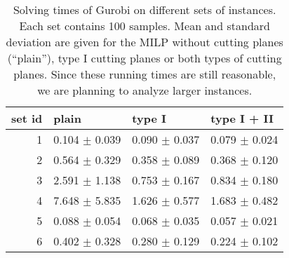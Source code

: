 

\begin{knitrout}
\color{fgcolor}\begin{table}

\caption{\label{tab:unnamed-chunk-2}Solving times of Gurobi on different sets of instances. Each set contains 100 samples. Mean and standard deviation are given for the MILP without cutting planes (``plain''), type I cutting planes or both types of cutting planes. {\color{blue} Since these running times are still reasonable, we are planning to analyze larger instances.} \label{tab:running_times}}
\centering
\begin{tabular}[t]{rlll}
\toprule
set id & plain & type I & type I + II\\
\midrule
1 & 0.104 $\pm$ 0.039 & 0.090 $\pm$ 0.037 & 0.079 $\pm$ 0.024\\
2 & 0.564 $\pm$ 0.329 & 0.358 $\pm$ 0.089 & 0.368 $\pm$ 0.120\\
3 & 2.591 $\pm$ 1.138 & 0.753 $\pm$ 0.167 & 0.834 $\pm$ 0.180\\
4 & 7.648 $\pm$ 5.835 & 1.626 $\pm$ 0.577 & 1.683 $\pm$ 0.482\\
5 & 0.088 $\pm$ 0.054 & 0.068 $\pm$ 0.035 & 0.057 $\pm$ 0.021\\
6 & 0.402 $\pm$ 0.328 & 0.280 $\pm$ 0.129 & 0.224 $\pm$ 0.102\\
\bottomrule
\end{tabular}
\end{table}

\end{knitrout}
